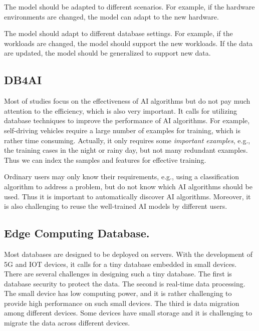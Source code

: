  The model should be adapted to different scenarios. For example, if the hardware environments are changed, the model can adapt to the new hardware. 
  
 The model should adapt to different database settings. For example, if the workloads are changed, the model should support the new workloads. If the data are updated, the model should be generalized to support new data. 
 

\subsection{DB4AI}

 Most of studies focus on the effectiveness of AI algorithms but do not pay much attention to the efficiency, which is also very important. It calls for utilizing database techniques to improve the performance of AI algorithms. For example, self-driving vehicles require a large number of examples for training, which is rather time consuming. Actually, it only requires some {\it important examples}, e.g., the training cases in the night or rainy day, but not many redundant examples. Thus we can index the samples and features for effective training. 


 Ordinary users may only know their requirements, e.g., using a classification algorithm to address a problem, but do not know which AI algorithms should be used. Thus it is important to automatically discover AI algorithms. Moreover, it is also challenging to reuse the well-trained AI models by different users. 



\subsection{Edge Computing Database.} Most databases are designed to be deployed on servers. With the development of 5G and IOT devices, it calls for a tiny database embedded in small devices. There are several challenges in designing such a tiny database. The first is database  security to protect the data. The second is real-time data processing. The small device has low computing power, and it is rather challenging to provide high performance on such small devices. The third is data migration among different devices. Some devices have small storage and it is challenging to migrate the data across different devices. 



